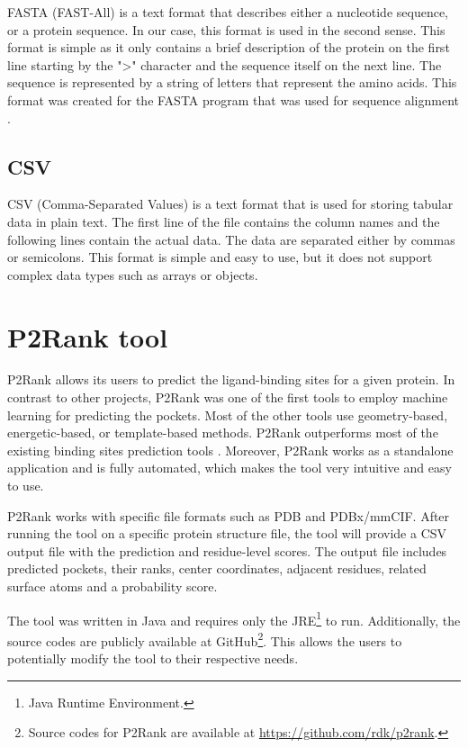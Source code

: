 FASTA (FAST-All) is a text format that describes either a nucleotide sequence, or a protein sequence. In our case, this format is used in the second sense. This format is simple as it only contains a brief description of the protein on the first line starting by the ">" character and the sequence itself on the next line. The sequence is represented by a string of letters that represent the amino acids. This format was created for the FASTA program that was used for sequence alignment \cite{lipman1985rapid}.

\subsection{CSV}
\label{subsec:CSV}

CSV (Comma-Separated Values) is a text format that is used for storing tabular data in plain text. The first line of the file contains the column names and the following lines contain the actual data. The data are separated either by commas or semicolons. This format is simple and easy to use, but it does not support complex data types such as arrays or objects.

\section{P2Rank tool}
\label{sec:p2rank}

P2Rank allows its users to predict the ligand-binding sites for a given protein. In contrast to other projects, P2Rank was one of the first tools to employ machine learning for predicting the pockets. Most of the other tools use geometry-based, energetic-based, or template-based methods. P2Rank outperforms most of the existing binding sites prediction tools \cite{krivak2018p2rank}. Moreover, P2Rank works as a standalone application and is fully automated, which makes the tool very intuitive and easy to use.

P2Rank works with specific file formats such as PDB and PDBx/mmCIF. After running the tool on a specific protein structure file, the tool will provide a CSV output file with the prediction and residue-level scores. The output file includes predicted pockets, their ranks, center coordinates, adjacent residues, related surface atoms and a probability score.

The tool was written in Java and requires only the JRE\footnote{Java Runtime Environment.} to run. Additionally, the source codes are publicly available at GitHub\footnote{Source codes for P2Rank are available at \url{https://github.com/rdk/p2rank}.}. This allows the users to potentially modify the tool to their respective needs. 

